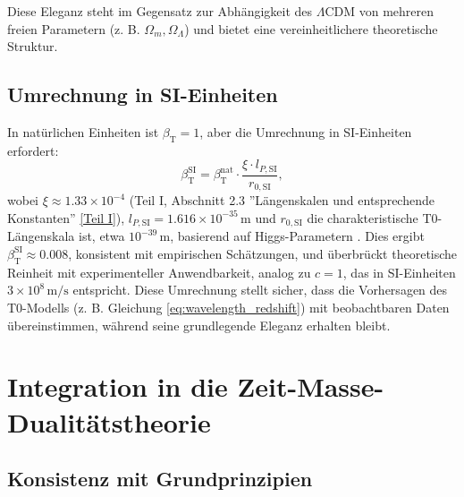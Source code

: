 \documentclass[12pt,a4paper]{article}
\newcommand{\betaT}{\beta_{\text{T}}}
\begin{document}
	Diese Eleganz steht im Gegensatz zur Abhängigkeit des \(\Lambda\)CDM von mehreren freien Parametern (z. B. \(\Omega_m, \Omega_{\Lambda}\)) und bietet eine vereinheitlichere theoretische Struktur.
	
	\subsection{Umrechnung in SI-Einheiten}
	\label{subsec:conversion_si}
	
	In natürlichen Einheiten ist \(\betaT = 1\), aber die Umrechnung in SI-Einheiten erfordert:
	\begin{equation}
		\betaT^{\text{SI}} = \betaT^{\text{nat}} \cdot \frac{\xi \cdot l_{P,\text{SI}}}{r_{0,\text{SI}}},
		\label{eq:beta_conversion}
	\end{equation}
	wobei \(\xi \approx 1.33 \times 10^{-4}\) (Teil I, Abschnitt 2.3 ''Längenskalen und entsprechende Konstanten'' \href{https://github.com/jpascher/T0-Time-Mass-Duality/tree/main/2/pdf/Deutsch/QMRelTimeMassPart1.pdf}{[Teil I]}), \(l_{P,\text{SI}} = 1.616 \times 10^{-35} \, \text{m}\) und \(r_{0,\text{SI}}\) die charakteristische T0-Längenskala ist, etwa \(10^{-39} \, \text{m}\), basierend auf Higgs-Parametern \cite{pascher_alphabeta_2025}. Dies ergibt \(\betaT^{\text{SI}} \approx 0.008\), konsistent mit empirischen Schätzungen, und überbrückt theoretische Reinheit mit experimenteller Anwendbarkeit, analog zu \(c = 1\), das in SI-Einheiten \(3 \times 10^8 \, \text{m/s}\) entspricht. Diese Umrechnung stellt sicher, dass die Vorhersagen des T0-Modells (z. B. Gleichung \ref{eq:wavelength_redshift}) mit beobachtbaren Daten übereinstimmen, während seine grundlegende Eleganz erhalten bleibt.
	
	\section{Integration in die Zeit-Masse-Dualitätstheorie}
	\label{sec:integration_t0}
	
	\subsection{Konsistenz mit Grundprinzipien}
	\label{subsec:consistency_principles}
	
\end{document}
